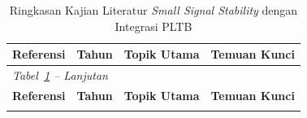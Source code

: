 \begin{longtable}{p{1.8cm} p{1.2cm} p{3.6cm} p{7.0cm}}
\caption{Ringkasan Kajian Literatur \textit{Small Signal Stability} dengan
Integrasi PLTB}
\label{tab:ringkasan-pustaka} \\
\toprule
\multicolumn{1}{c}{\textbf{Referensi}} &
\multicolumn{1}{c}{\textbf{Tahun}} &
\multicolumn{1}{c}{\textbf{Topik Utama}} &
\multicolumn{1}{c}{\textbf{Temuan Kunci}} \\
\midrule
\endfirsthead
\multicolumn{4}{l}{\textit{Tabel~\ref{tab:ringkasan-pustaka} -- Lanjutan}} \\
\toprule
\multicolumn{1}{c}{\textbf{Referensi}} &
\multicolumn{1}{c}{\textbf{Tahun}} &
\multicolumn{1}{c}{\textbf{Topik Utama}} &
\multicolumn{1}{c}{\textbf{Temuan Kunci}} \\
\midrule
\endhead
\bottomrule
\endfoot


\end{longtable}
